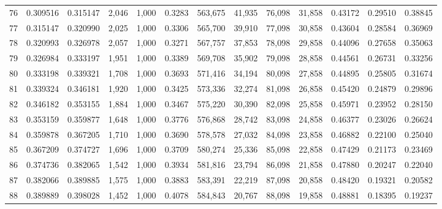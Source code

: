 \begin{tabular}{rrrrrrrrrrrrr}
76  &  0.309516 &  0.315147 &   2,046 &  1,000 &                                     0.3283 &  563,675 &   41,935 &   76,098 &   31,858 &  0.43172 &  0.29510 &  0.38845 \\
77  &  0.315147 &  0.320990 &   2,025 &  1,000 &                                     0.3306 &  565,700 &   39,910 &   77,098 &   30,858 &  0.43604 &  0.28584 &  0.36969 \\
78  &  0.320993 &  0.326978 &   2,057 &  1,000 &                                     0.3271 &  567,757 &   37,853 &   78,098 &   29,858 &  0.44096 &  0.27658 &  0.35063 \\
79  &  0.326984 &  0.333197 &   1,951 &  1,000 &                                     0.3389 &  569,708 &   35,902 &   79,098 &   28,858 &  0.44561 &  0.26731 &  0.33256 \\
80  &  0.333198 &  0.339321 &   1,708 &  1,000 &                                     0.3693 &  571,416 &   34,194 &   80,098 &   27,858 &  0.44895 &  0.25805 &  0.31674 \\
81  &  0.339324 &  0.346181 &   1,920 &  1,000 &                                     0.3425 &  573,336 &   32,274 &   81,098 &   26,858 &  0.45420 &  0.24879 &  0.29896 \\
82  &  0.346182 &  0.353155 &   1,884 &  1,000 &                                     0.3467 &  575,220 &   30,390 &   82,098 &   25,858 &  0.45971 &  0.23952 &  0.28150 \\
83  &  0.353159 &  0.359877 &   1,648 &  1,000 &                                     0.3776 &  576,868 &   28,742 &   83,098 &   24,858 &  0.46377 &  0.23026 &  0.26624 \\
84  &  0.359878 &  0.367205 &   1,710 &  1,000 &                                     0.3690 &  578,578 &   27,032 &   84,098 &   23,858 &  0.46882 &  0.22100 &  0.25040 \\
85  &  0.367209 &  0.374727 &   1,696 &  1,000 &                                     0.3709 &  580,274 &   25,336 &   85,098 &   22,858 &  0.47429 &  0.21173 &  0.23469 \\
86  &  0.374736 &  0.382065 &   1,542 &  1,000 &                                     0.3934 &  581,816 &   23,794 &   86,098 &   21,858 &  0.47880 &  0.20247 &  0.22040 \\
87  &  0.382066 &  0.389885 &   1,575 &  1,000 &                                     0.3883 &  583,391 &   22,219 &   87,098 &   20,858 &  0.48420 &  0.19321 &  0.20582 \\
88  &  0.389889 &  0.398028 &   1,452 &  1,000 &                                     0.4078 &  584,843 &   20,767 &   88,098 &   19,858 &  0.48881 &  0.18395 &  0.19237 \\

\end{tabular}

